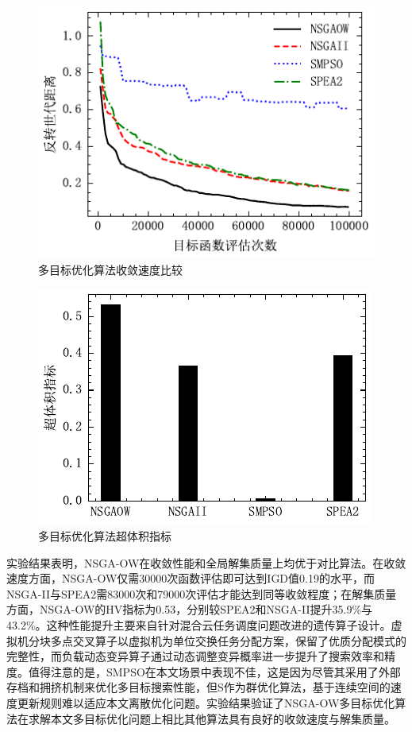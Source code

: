 \begin{figure}[htb]
    \includegraphics{img/igd.pdf}
    \caption{多目标优化算法收敛速度比较}\label{fig:gd}
\end{figure}
\begin{figure}
    \includegraphics{img/hv.pdf}
    \caption{多目标优化算法超体积指标}\label{fig:hv}
\end{figure}

实验结果表明，NSGA-OW在收敛性能和全局解集质量上均优于对比算法。在收敛速度方面，NSGA-OW仅需30000次函数评估即可达到IGD值0.19的水平，而NSGA-II与SPEA2需83000次和79000次评估才能达到同等收敛程度；在解集质量方面，NSGA-OW的HV指标为0.53，分别较SPEA2和NSGA-II提升35.9\%与43.2\%。这种性能提升主要来自针对混合云任务调度问题改进的遗传算子设计。虚拟机分块多点交叉算子以虚拟机为单位交换任务分配方案，保留了优质分配模式的完整性，而负载动态变异算子通过动态调整变异概率进一步提升了搜索效率和精度。值得注意的是，SMPSO在本文场景中表现不佳，这是因为尽管其采用了外部存档和拥挤机制来优化多目标搜索性能，但S作为群优化算法，基于连续空间的速度更新规则难以适应本文离散优化问题。实验结果验证了NSGA-OW多目标优化算法在求解本文多目标优化问题上相比其他算法具有良好的收敛速度与解集质量。

